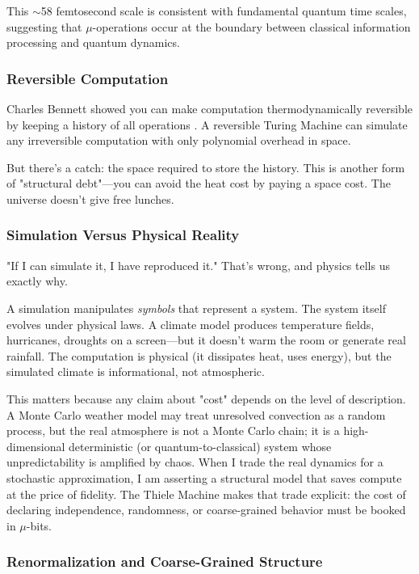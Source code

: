 This $\sim$58 femtosecond scale is consistent with fundamental quantum time scales, suggesting that $\mu$-operations occur at the boundary between classical information processing and quantum dynamics.

\subsubsection{Reversible Computation}

Charles Bennett showed you can make computation thermodynamically reversible by keeping a history of all operations \cite{bennett1982thermodynamics}. A reversible Turing Machine can simulate any irreversible computation with only polynomial overhead in space.

But there's a catch: the space required to store the history. This is another form of "structural debt"---you can avoid the heat cost by paying a space cost. The universe doesn't give free lunches.

\subsubsection{Simulation Versus Physical Reality}

"If I can simulate it, I have reproduced it." That's wrong, and physics tells us exactly why.

A simulation manipulates \emph{symbols} that represent a system. The system itself evolves under physical laws. A climate model produces temperature fields, hurricanes, droughts on a screen---but it doesn't warm the room or generate real rainfall. The computation is physical (it dissipates heat, uses energy), but the simulated climate is informational, not atmospheric.

This matters because any claim about "cost" depends on the level of description. A Monte Carlo weather model may treat unresolved convection as a random process, but the real atmosphere is not a Monte Carlo chain; it is a high-dimensional deterministic (or quantum-to-classical) system whose unpredictability is amplified by chaos. When I trade the real dynamics for a stochastic approximation, I am asserting a structural model that saves compute at the price of fidelity. The Thiele Machine makes that trade explicit: the cost of declaring independence, randomness, or coarse-grained behavior must be booked in $\mu$-bits.

\subsubsection{Renormalization and Coarse-Grained Structure}

